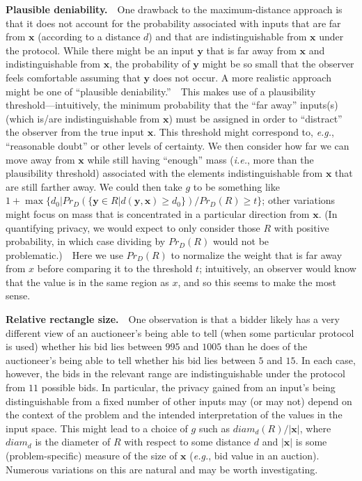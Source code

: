\documentclass{article}
\theoremstyle{theorem}
\theoremstyle{definition}
\theoremstyle{remark}
\newcommand{\ie}{\emph{i.e.}}
\newcommand{\eg}{\emph{e.g.}}
\begin{document}
\textbf{Plausible deniability.}\ \ One drawback to the maximum-distance approach is that it does not account for the probability associated with inputs that are far from $\mathbf{x}$ (according to a distance $d$) and that are indistinguishable from $\mathbf{x}$ under the protocol.  While there might be an input $\mathbf{y}$ that is far away from $\mathbf{x}$ and indistinguishable from $\mathbf{x}$, the probability of $\mathbf{y}$ might be so small that the observer feels comfortable assuming that $\mathbf{y}$ does not occur.  A more realistic approach might be one of ``plausible deniability.''\ \ This makes use of a plausibility threshold---intuitively, the minimum probability that the ``far away'' inputs(s) (which is/are indistinguishable from $\mathbf{x}$) must be assigned in order to ``distract'' the observer from the true input $\mathbf{x}$.  This threshold might correspond to, \eg, ``reasonable doubt'' or other levels of certainty.  We then consider how far we can move away from $\mathbf{x}$ while still having ``enough'' mass (\ie, more than the plausibility threshold) associated with the elements indistinguishable from $\mathbf{x}$ that are still farther away.  We could then take $g$ to be something like $1+\max \{d_0 | Pr_D(\{\mathbf{y}\in R|d(\mathbf{y},\mathbf{x})\geq d_0\})/Pr_D(R) \geq t\}$; other variations might focus on mass that is concentrated in a particular direction from $\mathbf{x}$.  (In quantifying privacy, we would expect to only consider those $R$ with positive probability, in which case dividing by $Pr_D(R)$ would not be problematic.)\ \ Here we use $Pr_D(R)$ to normalize the weight that is far away from $x$ before comparing it to the threshold $t$; intuitively, an observer would know that the value is in the same region as $x$, and so this seems to make the most sense.

\textbf{Relative rectangle size.}\ \ One observation is that a bidder likely has a very different view of an auctioneer's being able to tell (when some particular protocol is used) whether his bid lies between $995$ and $1005$ than he does of the auctioneer's being able to tell whether his bid lies between $5$ and $15$.  In each case, however, the bids in the relevant range are indistinguishable under the protocol from $11$ possible bids.  In particular, the privacy gained from an input's being distinguishable from a fixed number of other inputs may (or may not) depend on the context of the problem and the intended interpretation of the values in the input space.  This might lead to a choice of $g$ such as $diam_d(R)/|\mathbf{x}|$, where $diam_d$ is the diameter of $R$ with respect to some distance $d$ and $|\mathbf{x}|$ is some (problem-specific) measure of the size of $\mathbf{x}$ (\eg, bid value in an auction).  Numerous variations on this are natural and may be worth investigating.
\end{document}
